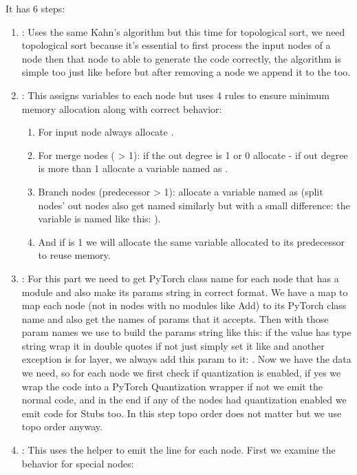 \documentclass{nngraph-en}
\begin{document}
It has 6 steps:
\begin{enumerate}
    \item {}: Uses the same Kahn's algorithm but this time for topological sort, we need topological sort because it's essential to first process the input nodes of a node then that node to able to generate the code correctly, the algorithm is simple too just like before but after removing a node we append it to the  too.
    \item {}: This assigns variables to each node but uses 4 rules to ensure minimum memory allocation along with correct behavior:
    \begin{enumerate}
        \item For input node always allocate .
        \item For merge nodes ( > 1): if the out degree is 1 or 0 allocate  - if out degree is more than 1 allocate a variable named as .
        \item Branch nodes (predecessor  > 1): allocate a variable named as  (split nodes' out nodes also get named similarly but with a small difference: the variable is named like this: ).
        \item And if  is 1 we will allocate the same variable allocated to its predecessor to reuse memory.
    \end{enumerate}
    \item {}: For this part we need to get PyTorch class name for each node that has a module and also make its params string in correct format. We have a map to map each node (not in nodes with no modules like Add) to its PyTorch class name and also get the names of params that it accepts. Then with those param names we use  to build the params string like this: if the value has type string wrap it in double quotes if not just simply set it like  and another exception is for  layer, we always add this param to it: . Now we have the data we need, so for each node we first check if quantization is enabled, if yes we wrap the code into a PyTorch Quantization wrapper if not we emit the normal code, and in the end if any of the nodes had quantization enabled we emit code for Stubs too. In this step topo order does not matter but we use topo order anyway.
    \item {}: This uses the helper  to emit the line for each node. First we examine the behavior for special nodes:
    

\end{enumerate}
\end{document}
